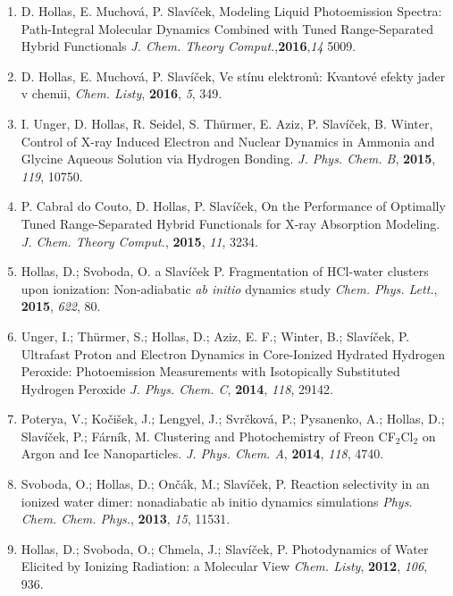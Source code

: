 \documentclass[a4paper,10pt]{article}
\begin{document}
\begin{enumerate}[(1)]
\item D. Hollas, E. Muchová, P. Slavíček, Modeling Liquid Photoemission Spectra: Path-Integral Molecular Dynamics Combined with Tuned Range-Separated Hybrid Functionals \textit{J. Chem. Theory Comput.},\textbf{2016},\textit{14} 5009.

\item D. Hollas, E. Muchová, P. Slavíček, Ve stínu elektronů: Kvantové efekty jader v chemii, \textit{Chem. Listy}, \textbf{2016}, \textit{5}, 349.

\item 
I. Unger, D. Hollas, R. Seidel, S. Thürmer, E. Aziz, P. Slavíček, B. Winter, Control of X-ray Induced Electron and Nuclear Dynamics in Ammonia and Glycine Aqueous Solution via Hydrogen Bonding. \textit{J. Phys. Chem. B}, \textbf{2015}, \textit{119}, 10750.


\item P. Cabral do Couto, D. Hollas, P. Slavíček, On the Performance of Optimally Tuned Range-Separated Hybrid Functionals for X-ray Absorption Modeling. \textit{J. Chem. Theory Comput.}, \textbf{2015}, \textit{11}, 3234.

\item Hollas, D.; Svoboda, O. a Slavíček P. Fragmentation of HCl-water clusters upon ionization: Non-adiabatic \textit{ab initio} dynamics study \textit{Chem. Phys. Lett.}, \textbf{2015}, \textit{622}, 80.

\item Unger, I.; Thürmer, S.; Hollas, D.; Aziz, E. F.; Winter, B.; Slavíček, P. Ultrafast Proton and Electron Dynamics in Core-Ionized Hydrated Hydrogen Peroxide: Photoemission Measurements with Isotopically Substituted Hydrogen Peroxide \textit{J. Phys. Chem. C}, \textbf{2014}, \textit{118}, 29142.

\item Poterya, V.; Kočišek, J.; Lengyel, J.; Svrčková, P.; Pysanenko, A.; Hollas, D.; Slavíček, P.; Fárník, M. Clustering and Photochemistry of Freon CF$_2$Cl$_2$ on Argon and Ice Nanoparticles. \textit{J. Phys. Chem. A}, \textbf{2014}, \textit{118}, 4740.

\item Svoboda, O.; Hollas, D.; Ončák, M.; Slavíček, P. Reaction selectivity in an ionized water dimer: nonadiabatic ab initio dynamics simulations \textit{Phys. Chem. Chem. Phys.}, \textbf{2013}, \textit{15}, 11531.

\item Hollas, D.; Svoboda, O.; Chmela, J.; Slavíček, P. Photodynamics of Water Elicited by Ionizing Radiation: a Molecular View \textit{Chem. Listy}, \textbf{2012}, \textit{106}, 936.


\end{enumerate}
\end{document}
